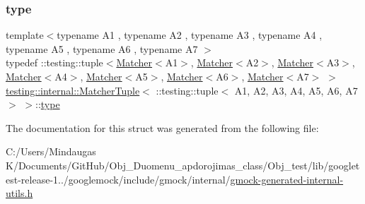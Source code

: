 \subsubsection{\texorpdfstring{type}{type}}
{\footnotesize\ttfamily template$<$typename A1 , typename A2 , typename A3 , typename A4 , typename A5 , typename A6 , typename A7 $>$ \\
typedef \+::testing\+::tuple$<$\mbox{\hyperlink{classtesting_1_1_matcher}{Matcher}}$<$A1$>$, \mbox{\hyperlink{classtesting_1_1_matcher}{Matcher}}$<$A2$>$, \mbox{\hyperlink{classtesting_1_1_matcher}{Matcher}}$<$A3$>$, \mbox{\hyperlink{classtesting_1_1_matcher}{Matcher}}$<$A4$>$, \mbox{\hyperlink{classtesting_1_1_matcher}{Matcher}}$<$A5$>$, \mbox{\hyperlink{classtesting_1_1_matcher}{Matcher}}$<$A6$>$, \mbox{\hyperlink{classtesting_1_1_matcher}{Matcher}}$<$A7$>$ $>$ \mbox{\hyperlink{structtesting_1_1internal_1_1_matcher_tuple}{testing\+::internal\+::\+Matcher\+Tuple}}$<$ \+::testing\+::tuple$<$ A1, A2, A3, A4, A5, A6, A7 $>$ $>$\+::\mbox{\hyperlink{structtesting_1_1internal_1_1_matcher_tuple_3_01_1_1testing_1_1tuple_3_01_a1_00_01_a2_00_01_a3_0064798126035aa0d3ca935c3449bf0c1_a733b8ef9996b7f465e9018393bec5cc4}{type}}}



The documentation for this struct was generated from the following file\+:\begin{DoxyCompactItemize}
\item 
C\+:/\+Users/\+Mindaugas K/\+Documents/\+Git\+Hub/\+Obj\+\_\+\+Duomenu\+\_\+apdorojimas\+\_\+class/\+Obj\+\_\+test/lib/googletest-\/release-\/1../googlemock/include/gmock/internal/\mbox{\hyperlink{gmock-generated-internal-utils_8h}{gmock-\/generated-\/internal-\/utils.\+h}}\end{DoxyCompactItemize}
